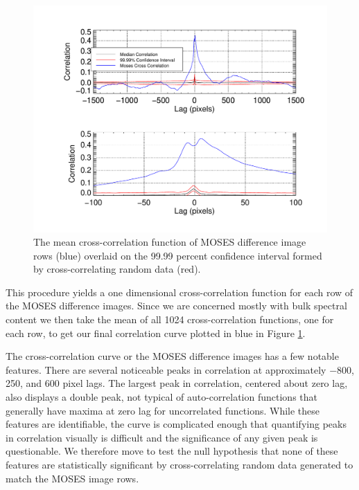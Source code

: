 \documentclass[]{solarphysics}
\begin{document}
\begin{article}
			 	
		\begin{figure}
		\centering
		\includegraphics[width=\linewidth]{images/sigtest_5}
		\caption{The mean cross-correlation function of MOSES difference image rows (blue) overlaid on the 99.99 percent confidence interval formed by cross-correlating random data (red). }
		\label{fig:sigtest}
		\end{figure}
 	
	 This procedure yields a one dimensional cross-correlation function for each row of the MOSES difference images.  Since we are concerned mostly with bulk spectral content we then take the mean of all 1024 cross-correlation functions, one for each row, to get our final correlation curve plotted in blue in Figure \ref{fig:sigtest}. 
	 
	 The cross-correlation curve or the MOSES difference images has a few notable features.  There are several noticeable peaks in correlation  at approximately $-800$, 250, and 600 pixel lags.  The largest peak in correlation, centered about zero lag, also displays a double peak, not typical of auto-correlation functions that generally have  maxima at zero lag for uncorrelated functions.  While these features are identifiable, the curve is complicated enough that quantifying peaks in correlation visually is difficult and the significance of any given peak is questionable. We therefore move to test the null hypothesis that none of these features are statistically significant by cross-correlating random data generated to match the MOSES image rows.
 
	

\end{article}
\end{document}

